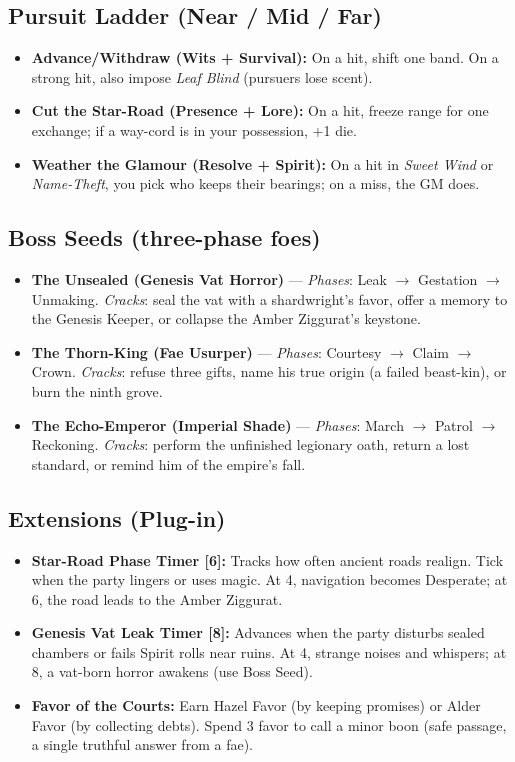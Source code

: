\subsection*{Pursuit Ladder (Near / Mid / Far)}
\begin{itemize}
\item \textbf{Advance/Withdraw (Wits + Survival):} On a hit, shift one band. On a strong hit, also impose \emph{Leaf Blind} (pursuers lose scent).
\item \textbf{Cut the Star-Road (Presence + Lore):} On a hit, freeze range for one exchange; if a way-cord is in your possession, +1 die.
\item \textbf{Weather the Glamour (Resolve + Spirit):} On a hit in \emph{Sweet Wind} or \emph{Name-Theft}, you pick who keeps their bearings; on a miss, the GM does.
\end{itemize}

\subsection*{Boss Seeds (three-phase foes)}
\begin{itemize}
\item \textbf{The Unsealed (Genesis Vat Horror)} --- \emph{Phases}: Leak $\rightarrow$ Gestation $\rightarrow$ Unmaking. \emph{Cracks}: seal the vat with a shardwright's favor, offer a memory to the Genesis Keeper, or collapse the Amber Ziggurat's keystone.
\item \textbf{The Thorn-King (Fae Usurper)} --- \emph{Phases}: Courtesy $\rightarrow$ Claim $\rightarrow$ Crown. \emph{Cracks}: refuse three gifts, name his true origin (a failed beast-kin), or burn the ninth grove.
\item \textbf{The Echo-Emperor (Imperial Shade)} --- \emph{Phases}: March $\rightarrow$ Patrol $\rightarrow$ Reckoning. \emph{Cracks}: perform the unfinished legionary oath, return a lost standard, or remind him of the empire's fall.
\end{itemize}

\subsection*{Extensions (Plug-in)}
\begin{itemize}
\item \textbf{Star-Road Phase Timer [6]:} Tracks how often ancient roads realign. Tick when the party lingers or uses magic. At 4, navigation becomes Desperate; at 6, the road leads to the Amber Ziggurat.
\item \textbf{Genesis Vat Leak Timer [8]:} Advances when the party disturbs sealed chambers or fails Spirit rolls near ruins. At 4, strange noises and whispers; at 8, a vat-born horror awakens (use Boss Seed).
\item \textbf{Favor of the Courts:} Earn Hazel Favor (by keeping promises) or Alder Favor (by collecting debts). Spend 3 favor to call a minor boon (safe passage, a single truthful answer from a fae).
\end{itemize}

